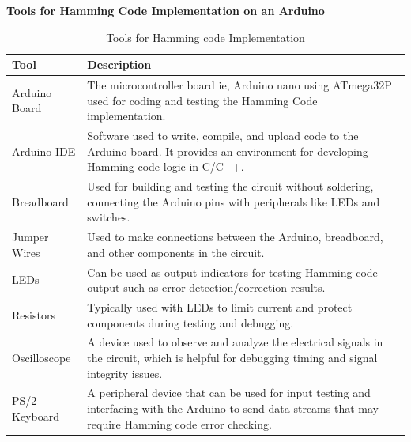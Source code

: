 \documentclass{article}
\numberwithin{equation}{section}
\numberwithin{figure}{section}
\numberwithin{table}{section}
\begin{document}
\textbf {Tools for Hamming Code Implementation on an Arduino}
\begin{table}[h!]
\caption{Tools for Hamming code Implementation}
\label{tab:5.1}
\begin{tabular}{|l|p{13cm}|}
\hline
\textbf{Tool} & \textbf{Description} \\
\hline
Arduino Board & The microcontroller board ie, Arduino nano using ATmega32P used for coding and testing the Hamming Code implementation. \\
\hline
Arduino IDE & Software used to write, compile, and upload code to the Arduino board. It provides an environment for developing Hamming code logic in C/C++. \\
\hline
Breadboard & Used for building and testing the circuit without soldering, connecting the Arduino pins with peripherals like LEDs and switches. \\
\hline
Jumper Wires & Used to make connections between the Arduino, breadboard, and other components in the circuit. \\
\hline
LEDs & Can be used as output indicators for testing Hamming code output such as error detection/correction results. \\
\hline
Resistors & Typically used with LEDs to limit current and protect components during testing and debugging. \\
\hline
Oscilloscope & A device used to observe and analyze the electrical signals in the circuit, which is helpful for debugging timing and signal integrity issues. \\
\hline
PS/2 Keyboard & A peripheral device that can be used for input testing and interfacing with the Arduino to send data streams that may require Hamming code error checking. \\
\hline
\end{tabular}

\end{table}

\pagebreak
\end{document}
